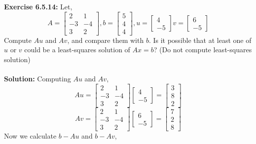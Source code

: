 \documentclass{amsart}
\begin{document}
\begin{enumerate}
\noindent\textbf{Exercise 6.5.14: }Let,
\begin{equation*}
A = 
\begin{bmatrix}
2&1\\
-3&-4\\
3&2
\end{bmatrix},
b = 
\begin{bmatrix}
5\\
4\\
4
\end{bmatrix}, 
u = 
\begin{bmatrix}
4\\
-5
\end{bmatrix}
v = 
\begin{bmatrix}
6\\
-5
\end{bmatrix}
\end{equation*}
Compute $Au$ and $Av$, and compare them with $b$. Is it possible that at least one of $u$ or $v$ could be a least-squares solution of $Ax = b$? (Do not compute least-squares solution)\\\\
\textbf{Solution: }Computing $Au$ and $Av$,
\begin{equation*}
Au = 
\begin{bmatrix}
2&1\\
-3&-4\\
3&2
\end{bmatrix}
\begin{bmatrix}
4\\
-5
\end{bmatrix}
 = 
 \begin{bmatrix}
3\\
8\\
2
\end{bmatrix}
\end{equation*}
\begin{equation*}
Av = 
\begin{bmatrix}
2&1\\
-3&-4\\
3&2
\end{bmatrix}
\begin{bmatrix}
6\\
-5
\end{bmatrix}
 = 
 \begin{bmatrix}
7\\
2\\
8
\end{bmatrix}
\end{equation*}
Now we calculate $b - Au$ and $b - Av$,

\end{enumerate}
\end{document}

